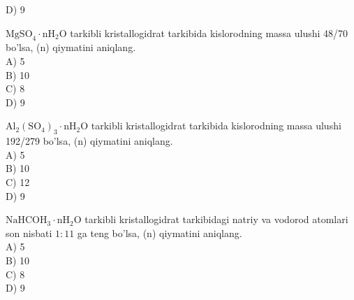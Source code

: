 D) 9
  \item $\mathrm{MgSO}_{4} \cdot \mathrm{nH}_{2} \mathrm{O}$ tarkibli kristallogidrat tarkibida kislorodning massa ulushi 48/70 bo'lsa, (n) qiymatini aniqlang.\\
A) 5\\
B) 10\\
C) 8\\
D) 9
  \item $\mathrm{Al}_{2}\left(\mathrm{SO}_{4}\right)_{3} \cdot \mathrm{nH}_{2} \mathrm{O}$ tarkibli kristallogidrat tarkibida kislorodning massa ulushi 192/279 bo'lsa, (n) qiymatini aniqlang.\\
A) 5\\
B) 10\\
C) 12\\
D) 9
  \item $\mathrm{NaHCO} \mathrm{H}_{3} \cdot \mathrm{nH}_{2} \mathrm{O}$ tarkibli kristallogidrat tarkibidagi natriy va vodorod atomlari son nisbati $1: 11$ ga teng bo'lsa, (n) qiymatini aniqlang.\\
A) 5\\
B) 10\\
C) 8\\
D) 9




